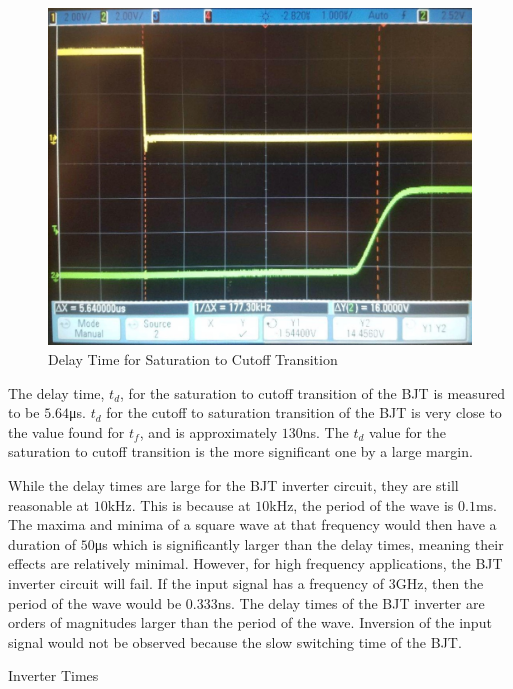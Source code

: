 \FloatBarrier
\begin{figure}[h!]
	\centering
	\includegraphics[scale=0.26]{./images/inverter_td.jpeg}
	\caption{Delay Time for Saturation to Cutoff Transition}
	\label{fig:inverter_td}
\end{figure}
\FloatBarrier

The delay time, $t_d$, for the saturation to cutoff transition of the BJT is measured to be $5.64$\si{\micro\second}. $t_d$ for the cutoff to saturation transition of the BJT is very close to the value found for $t_f$, and is approximately $130$\si{\nano\second}. The $t_d$ value for the saturation to cutoff transition is the more significant one by a large margin.

While the delay times are large for the BJT inverter circuit, they are still reasonable at $10$\si{\kilo\hertz}. This is because at $10$\si{\kilo\hertz}, the period of the wave is $0.1$\si{\milli\second}. The maxima and minima of a square wave at that frequency would then have a duration of $50$\si{\micro\second} which is significantly larger than the delay times, meaning their effects are relatively minimal. However, for high frequency applications, the BJT inverter circuit will fail. If the input signal has a frequency of $3$\si{\giga\hertz}, then the period of the wave would be $0.333$\si{\nano\second}. The delay times of the BJT inverter are orders of magnitudes larger than the period of the wave. Inversion of the input signal would not be observed because the slow switching time of the BJT.

\FloatBarrier
\begin{table}[h!]
	\centering
	\caption{Inverter Times}
	\label{tab:inverter_times}
\end{table}
\FloatBarrier
